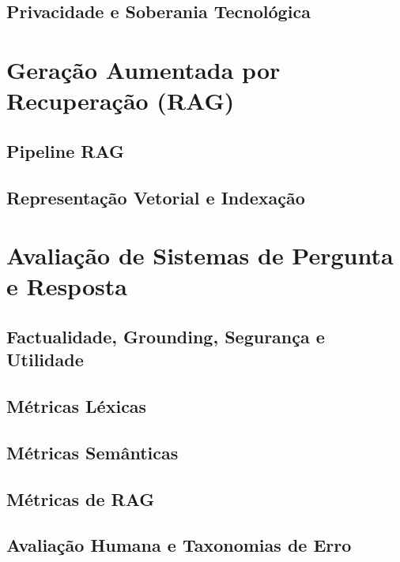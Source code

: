 \subsection{Privacidade e Soberania Tecnológica}


\section{Geração Aumentada por Recuperação (RAG)}

\subsection{Pipeline RAG}

\subsection{Representação Vetorial e Indexação}


\section{Avaliação de Sistemas de Pergunta e Resposta}

\subsection{Factualidade, Grounding, Segurança e Utilidade}

\subsection{Métricas Léxicas}

\subsection{Métricas Semânticas}

\subsection{Métricas de RAG}

\subsection{Avaliação Humana e Taxonomias de Erro}
